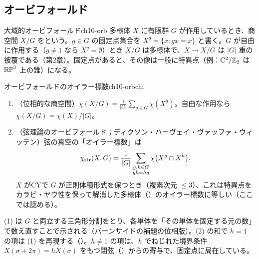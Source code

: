 \subsection{オービフォールド}

\begin{mydef}{大域的オービフォールド}{ch10-orb}
多様体 $X$ に有限群 $G$ が作用しているとき、商空間 $X/G$ をという。$g\in G$ の固定点集合を $X^g=\{x:gx=x\}$ と書く。$G$ が自由に作用する（$g\ne1$ なら $X^g=\emptyset$）とき $X/G$ は多様体で、$X\to X/G$ は $\lvert G\rvert$ 重の被覆である（第2章）。固定点があると、その像は一般に特異点（例：$\mathbb{C}^2/\mathbb{Z}_2$ は $\mathbb{RP}^3$ 上の錐）になる。
\end{mydef}

\begin{mythm}{オービフォールドのオイラー標数}{ch10-orbchi}
\begin{enumerate}
\item（位相的な商空間）$\displaystyle\chi(X/G)=\frac{1}{\lvert G\rvert}\sum_{g\in G}\chi(X^g)$。自由な作用なら $\chi(X/G)=\chi(X)/\lvert G\rvert$。
\item（弦理論のオービフォールド；ディクソン・ハーヴェイ・ヴァッファ・ウィッテン）弦の真空の「オイラー標数」は
\[
\chi_{\rm str}(X,G)=\frac{1}{\lvert G\rvert}\sum_{\substack{g,h\in G\\ gh=hg}}\chi\bigl(X^g\cap X^h\bigr).
\]
$X$ がCYで $G$ が正則体積形式を保つとき（複素次元 $\le3$）、これは特異点をカラビ・ヤウ性を保って解消した多様体（）のオイラー標数に等しい（ここでは認める）。
\end{enumerate}
\end{mythm}
\begin{note}
(1) は $G$ と両立する三角形分割をとり、各単体を「その単体を固定する元の数」で数え直すことで示される（バーンサイドの補題の位相版）。(2) の和で $h=1$ の項は (1) を再現する（）。$h\ne1$ の項は、$h$ でねじれた境界条件 $X(\sigma+2\pi)=hX(\sigma)$ をもつ閉弦（）からの寄与で、固定点に局在している。
\end{note}

